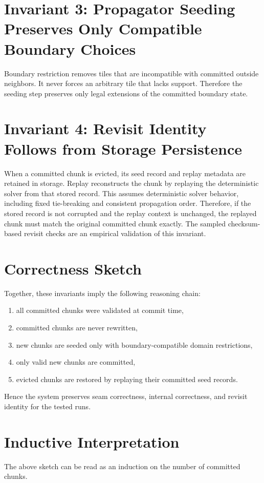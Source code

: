 \documentclass[12pt,a4paper]{report}
\begin{document}
\section{Invariant 3: Propagator Seeding Preserves Only Compatible Boundary Choices}
Boundary restriction removes tiles that are incompatible with committed outside neighbors. It never forces an arbitrary tile that lacks support. Therefore the seeding step preserves only legal extensions of the committed boundary state.

\section{Invariant 4: Revisit Identity Follows from Storage Persistence}
When a committed chunk is evicted, its seed record and replay metadata are retained in storage. Replay reconstructs the chunk by replaying the deterministic solver from that stored record. This assumes deterministic solver behavior, including fixed tie-breaking and consistent propagation order. Therefore, if the stored record is not corrupted and the replay context is unchanged, the replayed chunk must match the original committed chunk exactly. The sampled checksum-based revisit checks are an empirical validation of this invariant.

\section{Correctness Sketch}
Together, these invariants imply the following reasoning chain:
\begin{enumerate}
\item all committed chunks were validated at commit time,
\item committed chunks are never rewritten,
\item new chunks are seeded only with boundary-compatible domain restrictions,
\item only valid new chunks are committed,
\item evicted chunks are restored by replaying their committed seed records.
\end{enumerate}
Hence the system preserves seam correctness, internal correctness, and revisit identity for the tested runs.

\section{Inductive Interpretation}
The above sketch can be read as an induction on the number of committed chunks.
\end{document}
